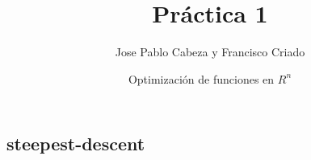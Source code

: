 \documentclass[10pt]{article}
\title{Práctica 1}
\date{Optimización de funciones en $R^n$}
\author{Jose Pablo Cabeza y Francisco Criado}
\theoremstyle{definition}
\begin{document}
\subsection{steepest-descent}

\end{document}
